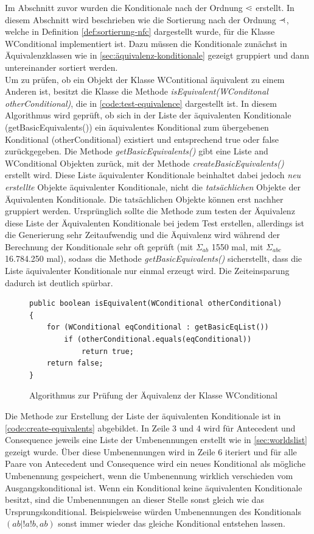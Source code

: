 \documentclass[12pt,a4paper]{article}
\newcommand\dotl{\mathrel{%
    \mathchoice{\QEQ}{\QEQ}{\QEQ}{\QEQ}%
}}
\def\QEQ{{%
    \setbox0\hbox{<}%
    \rlap{\hbox to \wd0{\hss \raisebox {0.1pt}{$\ \cdot$\hss}}}\box0
}}
\newcommand\rdotl{\mathrel{%
    \mathchoice{\RQEQ}{\RQEQ}{\RQEQ}{\RQEQ}%
}}
\def\RQEQ{{%
    \setbox0\hbox{$\prec$}%
    \rlap{\hbox to \wd0{\hss \raisebox {0.01pt}{$\ \cdot$\hss}}}\box0
}}
\begin{document}
Im Abschnitt zuvor wurden die Konditionale nach der Ordnung $\dotl$ erstellt. In diesem Abschnitt wird beschrieben wie die Sortierung nach der Ordnung $\rdotl$, welche in Definition \ref{def:sortierung-nfc} dargestellt wurde, für die Klasse WConditional implementiert ist. Dazu müssen die Konditionale zunächst in Äquivalenzklassen wie in \autoref{sec:äquivalenz-konditionale} gezeigt gruppiert und dann untereinander sortiert werden. \\
Um zu prüfen, ob ein Objekt der Klasse WContitional äquivalent zu einem Anderen ist, besitzt die Klasse die Methode \textit{isEquivalent(WConditonal otherConditional)}, die in \autoref{code:test-equivalence} dargestellt ist. In diesem Algorithmus wird geprüft, ob sich in der Liste der äquivalenten Konditionale (getBasicEquivalents()) ein äquivalentes Konditional zum übergebenen Konditional (otherConditional) existiert und entsprechend true oder false zurückgegeben. Die Methode \textit{getBasicEquivalents()} gibt eine Liste and WConditional Objekten zurück, mit der Methode \textit{createBasicEquivalents()} erstellt wird. Diese Liste äquivalenter Konditionale beinhaltet dabei jedoch \textit{neu erstellte} Objekte äquivalenter Konditionale, nicht die \textit{tatsächlichen} Objekte der Äquivalenten Konditionale. Die tatsächlichen Objekte können erst nachher gruppiert werden. Ursprünglich sollte die Methode zum testen der Äquivalenz diese Liste der Äquivalenten Konditionale bei jedem Test erstellen, allerdings ist die Generierung sehr Zeitaufwendig und die Äquivalenz wird während der Berechnung der Konditionale sehr oft geprüft (mit $\Sigma_{ab}$ 1550 mal, mit $\Sigma_{abc}$  16.784.250 mal), sodass die Methode \textit{getBasicEquivalents()} sicherstellt, dass die Liste äquivalenter Konditionale nur einmal erzeugt wird. Die Zeiteinsparung dadurch ist deutlich spürbar.


\begin{figure}
\begin{lstlisting}
public boolean isEquivalent(WConditional otherConditional) {
    for (WConditional eqConditional : getBasicEqList())
        if (otherConditional.equals(eqConditional))
            return true;
    return false;
}
\end{lstlisting}
\caption{Algorithmus zur Prüfung der Äquivalenz der Klasse WConditional}
\label{code:test-equivalence}
\end{figure} 





Die Methode zur Erstellung der Liste der äquivalenten Konditionale ist in \autoref{code:create-equivalents} abgebildet. In Zeile 3 und 4 wird für Antecedent und Consequence jeweils eine Liste der Umbenennungen erstellt wie in \autoref{sec:worldslist} gezeigt wurde. Über diese Umbenennungen wird in Zeile 6 iteriert und für alle Paare von Antecedent und Consequence wird ein neues Konditional als mögliche Umbenennung gespeichert, wenn die Umbenennung wirklich verschieden vom Ausgangskonditional ist. Wenn ein Konditional keine äquivalenten Konditionale besitzt, sind die Umbenennungen an dieser Stelle sonst gleich wie das Ursprungskonditional. Beispielsweise würden Umbenennungen des Konditionals $(ab|!a!b,ab)$ sonst immer wieder das gleiche Konditional entstehen lassen. 
\end{document}

